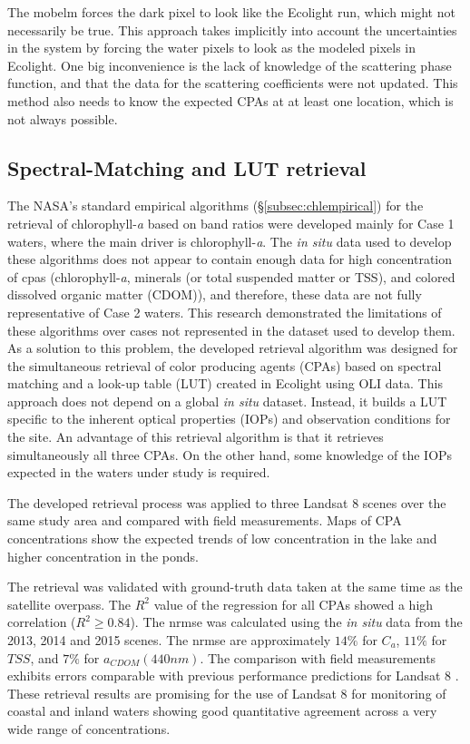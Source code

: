 The \gls{mobelm} forces the dark pixel to look like the Ecolight run, which might not necessarily be true. This approach takes implicitly into account the uncertainties in the system by forcing the water pixels to look as the modeled pixels in Ecolight. One big inconvenience is the lack of knowledge of the scattering phase function, and that the data for the scattering coefficients were not updated. This method also needs to know the expected CPAs at at least one location, which is not always possible.

\subsection{Spectral-Matching and LUT retrieval}
The NASA's standard empirical algorithms (\S\ref{subsec:chlempirical}) for the retrieval of chlorophyll-{\it a} based on band ratios were developed mainly for Case 1 waters, where the main driver is chlorophyll-{\it a}. The {\it in situ} data used to develop these algorithms does not appear to contain enough data for high concentration of \gls{cpas} (chlorophyll-{\it a}, minerals (or total suspended matter or TSS), and colored dissolved organic matter (CDOM)), and therefore, these data are not fully representative of Case 2 waters. This research demonstrated the limitations of these algorithms over cases not represented in the dataset used to develop them. As a solution to this problem, the developed retrieval algorithm was designed for the simultaneous retrieval of color producing agents (CPAs) based on spectral matching and a look-up table (LUT) created in Ecolight using OLI data. This approach does not depend on a global {\it in situ} dataset. Instead, it builds a LUT specific to the inherent optical properties (IOPs) and observation conditions for the site. An advantage of this retrieval algorithm is that it retrieves simultaneously all three CPAs. On the other hand, some knowledge of the IOPs expected in the waters under study is required.

The developed retrieval process was applied to three Landsat 8 scenes over the same study area and compared with field measurements. Maps of CPA concentrations show the expected trends of low concentration in the lake and higher concentration in the ponds.  

The retrieval was validated with ground-truth data taken at the same time as the satellite overpass. The $R^2$ value of the regression for all CPAs showed a high correlation ($R^2\geq0.84$). The \gls{nrmse} was calculated using the {\it in situ} data from the 2013, 2014 and 2015 scenes. The \gls{nrmse} are approximately $14\%$ for $C_a$, $11\%$ for $TSS$, and $7\%$ for $a_{CDOM}(440nm)$. The comparison with field measurements exhibits errors comparable with previous performance predictions for Landsat 8 \citep{Gerace:2013}. These retrieval results are promising for the use of Landsat 8 for monitoring of coastal and inland waters showing good quantitative agreement across a very wide range of concentrations.

